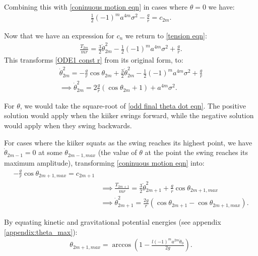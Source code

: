 \documentclass[12pt]{article}
\begin{document}
Combining this with \ref{coninuous motion eqn} in cases where $\theta = 0$ we have:
\begin{align}
    \frac{1}{2}(-1)^{m}a^{4m}\sigma^2 - \frac{g}{r} = c_{2m}.
\end{align}

Now that we have an expression for $c_n$ we return to \ref{tension eqn}:
\begin{align}
    \frac{T_{2m}}{mr} = \frac{3}{2}\dot{\theta}_{2m}^2 - \frac{1}{2}(-1)^{m}a^{4m}\sigma^2 + \frac{g}{r}.
\end{align}
This transforms \ref{ODE1 const r} from its original form, to:
\begin{align}
    \dot{\theta}_{2m}^2 = -\frac{g}{r}\cos{\theta_{2m}} + \frac{3}{2}\dot{\theta}_{2m}^2 - \frac{1}{2}(-1)^{m}a^{4m}\sigma^2 + \frac{g}{r}
    \\\implies\dot{\theta}_{2m}^2 = 2\frac{g}{r}(\cos{\theta}_{2m}+1) +a^{4m}\sigma^2. 
    \label{odd final theta dot eqn}
\end{align}

For $\theta$, we would take the square-root of \ref{odd final theta dot eqn}. The positive solution would apply when the kiiker swings forward, while the negative solution would apply when they swing backwards.

For cases where the kiiker squats as the swing reaches its highest point, we have $\dot{\theta}_{2m-1} = 0$ at some $\theta_{2m-1,max}$ (the value of $\theta$ at the point the swing reaches its maximum amplitude), transforming \ref{coninuous motion eqn} into:
\begin{align}
    -\frac{g}{r}\cos{\theta_{2m+1,max}} = c_{2m+1}
    \\&\implies \frac{T_{2m+1}}{mr} = \frac{3}{2}\dot{\theta}_{2m+1}^2 + \frac{g}{r}\cos{\theta_{2m+1,max}}
    \\&\implies \dot{\theta}_{2m+1}^2 = \frac{2g}{r}(\cos{\theta_{2m+1}}-\cos{\theta_{2m+1,max}}).
    \label{even final theta dot eqn}
\end{align}

By equating kinetic and gravitational potential energies (see appendix \ref{appendix:theta_max}):
\begin{align}
    \theta_{2m+1,max} = \arccos{(1-\frac{l(-1)^ma^{2m}\dot{\theta}_0}{2g})}.
\end{align}
\end{document}
